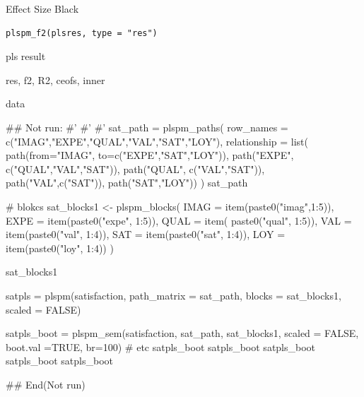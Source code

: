 \documentclass[a4paper]{book}
\begin{document}
%
\begin{Description}
Effect Size Black
\end{Description}
%
\begin{Usage}
\begin{verbatim}
plspm_f2(plsres, type = "res")
\end{verbatim}
\end{Usage}
%
\begin{Arguments}
\begin{ldescription}
\item[\code{plsres}] pls result

\item[\code{type}] res, f2, R2, ceofs, inner
\end{ldescription}
\end{Arguments}
%
\begin{Value}
data
\end{Value}
%
\begin{Examples}
\begin{ExampleCode}

\#\# Not run: 
#'
#' #'
sat_path = plspm_paths(
  row_names = c("IMAG","EXPE","QUAL","VAL","SAT","LOY"),
  relationship = list(
    path(from="IMAG", to=c("EXPE","SAT","LOY")),
    path("EXPE", c("QUAL","VAL","SAT")),
    path("QUAL", c("VAL","SAT")),
    path("VAL",c("SAT")),
    path("SAT","LOY"))
)
sat_path

# blokcs
sat_blocks1 <- plspm_blocks(
  IMAG = item(paste0("imag",1:5)),
  EXPE = item(paste0("expe", 1:5)),
  QUAL = item( paste0("qual", 1:5)),
  VAL = item(paste0("val", 1:4)),
  SAT = item(paste0("sat", 1:4)),
  LOY = item(paste0("loy", 1:4))
)

sat_blocks1

satpls = plspm(satisfaction,
               path_matrix = sat_path,
               blocks = sat_blocks1,
               scaled = FALSE)

satpls_boot = plspm_sem(satisfaction, sat_path, sat_blocks1, scaled = FALSE,
                        boot.val =TRUE, br=100)
# etc
satpls_boot%
satpls_boot%
satpls_boot%
satpls_boot%
satpls_boot%

## End(Not run)



\end{ExampleCode}
\end{Examples}
\end{document}
